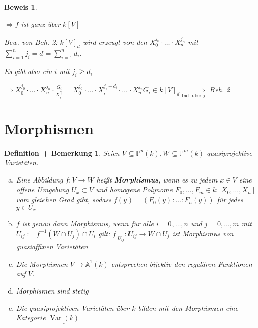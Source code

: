 \documentclass[a4paper, 12pt, numbers=noendperiod, chapterprefix=true]{scrbook}
\theoremstyle{break}
\newtheorem{DefBem}[Def]{Definition + Bemerkung}
\theoremstyle{nonumberbreak}
\newtheorem{Bew}{Beweis}
\theoremstyle{nonumberplain}
\newcommand{\emp}[1]{\textbf{\emph{#1}}}
\newcommand{\defterm}[1]{{\index{#1}}\emp{#1}}
\newcommand{\Sum}{\sum\limits}
\DeclareMathOperator{\Var}{Var}
\newcommand{\A}{\mathbb{A}}
\newcommand{\IP}{\mathbb{P}}%
\begin{document}
\begin{Bew}
\begin{enumerate}[a)]
	$\Rightarrow f$ ist ganz \"uber $k[V]$
	
	\emph{Bew. von Beh. 2}: $k[V]_d$ wird erzeugt von den $X_0^{j_0}\cdot\ldots\cdot X_n^{j_n}$ mit $\Sum_{i=1}^nj_i=d=\Sum_{i=1}^nd_i$.
	
	Es gibt also ein $i$ mit $j_i\ge d_i$
	
	$\Rightarrow X_0^{j_0}\cdot\ldots \cdot X_n^{j_n} \cdot \frac{G_i}{X_i^{d_i}} = X_0^{j_0}\cdot \ldots \cdot X_i^{j_i-d_i} \cdot\ldots \cdot X_n^{j_n}G_i\in k[V]_d \underset{\text{Ind. \"uber }j}{\Longrightarrow}$ Beh. 2
\end{enumerate}\end{Bew}

\newpage


\section{Morphismen}

\begin{DefBem}\label{bem13.1}
Seien $V\subseteq\IP^n(k), W\subseteq\IP^m(k)$ quasiprojektive Variet\"aten.\begin{enumerate}[a)]
\item
	Eine Abbildung $f:V\to W$ hei\ss t \defterm{Morphismus}, wenn es zu jedem $x\in V$ eine offene Umgebung $U_x \subset V$ und homogene Polynome $F_0,\ldots ,F_m \in k[X_0,\ldots ,X_n]$ vom gleichen Grad gibt, sodass $f(y)=(F_0(y):\ldots :F_n(y))$ f\"ur jedes $y\in U_x$
\item\label{bem13.1b}
	$f$ ist genau dann Morphismus, wenn f\"ur alle $i=0,\ldots ,n$ und $j=0,\ldots ,m$ mit $U_{ij}:=f^{-1}(W\cap U_j)\cap U_i$ gilt: $f|_{U_{ij}}:U_{ij}\to W\cap U_j$ ist Morphismus von quasiaffinen Variet\"aten
\item\label{bem13.1c}
	Die Morphismen $V\to \A^1(k)$ entsprechen bijektiv den regul\"aren Funktionen auf $V$.
\item\label{bem13.1d}
	Morphismen sind stetig
\item
	Die quasiprojektiven Variet\"aten \"uber $k$ bilden mit den Morphismen eine Kategorie $\underline{\Var(k)}$
\end{enumerate}\end{DefBem}
\end{document}
